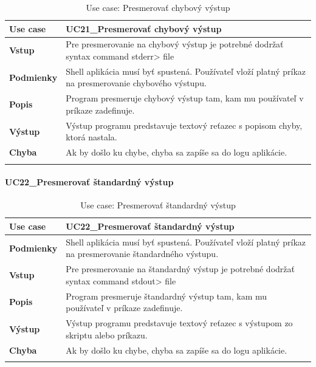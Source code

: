{\begin{center}
\begin{longtable}{|p{2.5cm}|p{12.2cm}|}
			\hline
			\textbf{Use case} & UC21\_Presmerovať chybový výstup \\ 
			\hline
			\textbf{Vstup} & Pre presmerovanie na chybový výstup je potrebné dodržať syntax command stderr> file\\
			\hline
			\textbf{Podmienky} & Shell aplikácia musí byť spustená. Používateľ vloží platný príkaz na presmerovanie chybového výstupu. \\ 
			\hline
			\textbf{Popis} & Program presmeruje chybový výstup tam, kam mu používateľ v príkaze zadefinuje. \\ 
			\hline
			\textbf{Výstup} & Výstup programu predstavuje textový reťazec s popisom chyby, ktorá nastala.\\
			\hline
			\textbf{Chyba} & Ak by došlo ku chybe, chyba sa zapíše sa do logu aplikácie.\\
			\hline
		\caption{Use case: Presmerovať chybový výstup}
		\label{table:1}
		
	\end{longtable}
\end{center}
\paragraph{UC22\_Presmerovať štandardný výstup}
\begin{center}
	\begin{longtable}{|p{2.5cm}|p{12.2cm}|}
		
			\hline
			\textbf{Use case} & UC22\_Presmerovať štandardný výstup \\ 
			\hline
			\textbf{Podmienky} & Shell aplikácia musí byť spustená. Používateľ vloží platný príkaz na presmerovanie štandardného výstupu. \\ 
			\hline
			\textbf{Vstup} & Pre presmerovanie na štandardný výstup je potrebné dodržať syntax command stdout> file\\
			\hline
			\textbf{Popis} & Program presmeruje štandardný výstup tam, kam mu používateľ v príkaze zadefinuje.\\ 
			\hline
			\textbf{Výstup} & Výstup programu predstavuje textový reťazec s výstupom zo skriptu alebo príkazu.\\
			\hline
			\textbf{Chyba} & Ak by došlo ku chybe, chyba sa zapíše sa do logu aplikácie.\\
			\hline
		\caption{Use case: Presmerovať štandardný výstup }
		\label{table:1}
		
	\end{longtable}
\end{center}



}
